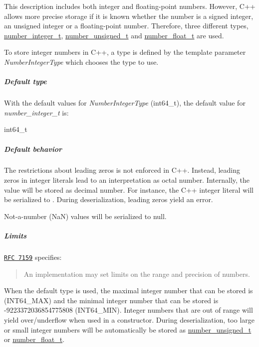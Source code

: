 This description includes both integer and floating-\/point numbers. However, C++ allows more precise storage if it is known whether the number is a signed integer, an unsigned integer or a floating-\/point number. Therefore, three different types, \hyperlink{classnlohmann_1_1basic__json_ac4b10b2364f26ce47bdb9a413ff04a59}{number\+\_\+integer\+\_\+t}, \hyperlink{classnlohmann_1_1basic__json_a60a04166c122072ab11eaf9845d9cd1d}{number\+\_\+unsigned\+\_\+t} and \hyperlink{classnlohmann_1_1basic__json_a74a0013e847fdc574b48f931f0e757e1}{number\+\_\+float\+\_\+t} are used.

To store integer numbers in C++, a type is defined by the template parameter {\itshape Number\+Integer\+Type} which chooses the type to use.

\subparagraph*{Default type}

With the default values for {\itshape Number\+Integer\+Type} ({\ttfamily int64\+\_\+t}), the default value for {\itshape number\+\_\+integer\+\_\+t} is\+:


\begin{DoxyCode}
int64\_t
\end{DoxyCode}


\subparagraph*{Default behavior}


\begin{DoxyItemize}
\item The restrictions about leading zeros is not enforced in C++. Instead, leading zeros in integer literals lead to an interpretation as octal number. Internally, the value will be stored as decimal number. For instance, the C++ integer literal {} will be serialized to {}. During deserialization, leading zeros yield an error.
\item Not-\/a-\/number (NaN) values will be serialized to {\ttfamily null}.
\end{DoxyItemize}

\subparagraph*{Limits}

\href{http://rfc7159.net/rfc7159}{\tt R\+FC 7159} specifies\+: \begin{quote}
An implementation may set limits on the range and precision of numbers. \end{quote}


When the default type is used, the maximal integer number that can be stored is {} (I\+N\+T64\+\_\+\+M\+AX) and the minimal integer number that can be stored is {\ttfamily -\/9223372036854775808} (I\+N\+T64\+\_\+\+M\+IN). Integer numbers that are out of range will yield over/underflow when used in a constructor. During deserialization, too large or small integer numbers will be automatically be stored as \hyperlink{classnlohmann_1_1basic__json_a60a04166c122072ab11eaf9845d9cd1d}{number\+\_\+unsigned\+\_\+t} or \hyperlink{classnlohmann_1_1basic__json_a74a0013e847fdc574b48f931f0e757e1}{number\+\_\+float\+\_\+t}.

